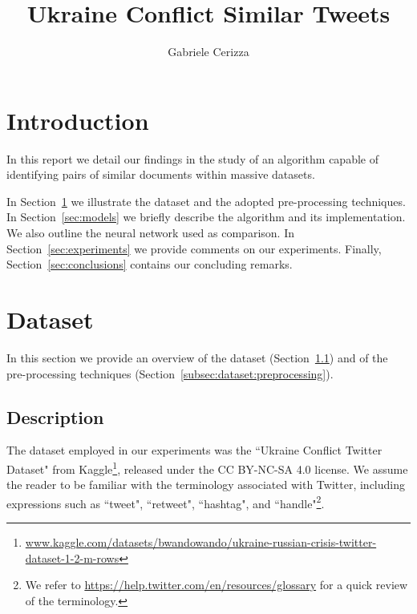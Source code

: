 \documentclass[runningheads]{llncs}
\begin{document}
\title{
    Ukraine Conflict Similar Tweets
}
\author{Gabriele Cerizza}


\maketitle

\section*{Introduction}
\label{sec:introduction}

In this report we detail our findings in the study of an algorithm capable of identifying pairs of similar documents within massive datasets.

In Section~\ref{sec:dataset} we illustrate the dataset and the adopted pre-processing techniques. In Section~\ref{sec:models} we briefly describe the algorithm and its implementation. We also outline the neural network used as comparison. In Section~\ref{sec:experiments} we provide comments on our experiments. Finally, Section~\ref{sec:conclusions} contains our concluding remarks.

\section{Dataset}
\label{sec:dataset}

In this section we provide an overview of the dataset (Section~\ref{subsec:dataset:description}) and of the pre-processing techniques (Section~\ref{subsec:dataset:preprocessing}).

\subsection{Description}
\label{subsec:dataset:description}

The dataset employed in our experiments was the “Ukraine Conflict Twitter Dataset" from Kaggle\footnote{\url{www.kaggle.com/datasets/bwandowando/ukraine-russian-crisis-twitter-dataset-1-2-m-rows}}, released under the CC BY-NC-SA 4.0 license. We assume the reader to be familiar with the terminology associated with Twitter, including expressions such as “tweet", “retweet", “hashtag", and “handle"\footnote{We refer to \url{https://help.twitter.com/en/resources/glossary} for a quick review of the terminology.}.
\end{document}
